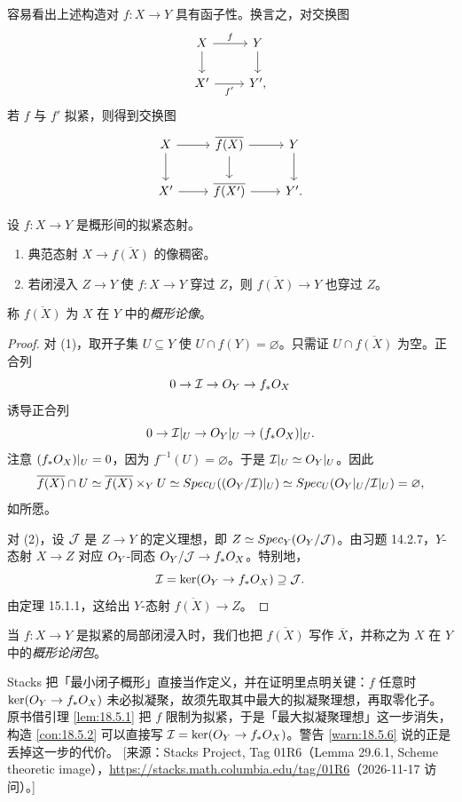 \begin{remark}\label{rem:18.5.3}
容易看出上述构造对 $f:X\to Y$ 具有函子性。换言之，对交换图
\[
\begin{tikzcd}
X \arrow[r,"f"] \arrow[d] & Y \arrow[d] \\
X' \arrow[r,"f'"'] & Y',
\end{tikzcd}
\]
若 $f$ 与 $f'$ 拟紧，则得到交换图
\[
\begin{tikzcd}
X \arrow[r] \arrow[d] & \overline{f(X)} \arrow[r] \arrow[d] & Y \arrow[d] \\
X' \arrow[r] & \overline{f(X')} \arrow[r] & Y'.
\end{tikzcd}
\]
\end{remark}

\begin{propdef}\label{prop:18.5.4}
设 $f:X\to Y$ 是概形间的拟紧态射。
\begin{enumerate}[label=(\roman*),leftmargin=2em,itemsep=0.25ex]
  \item 典范态射 $X\to\overline{f(X)}$ 的像稠密。
  \item 若闭浸入 $Z\to Y$ 使 $f:X\to Y$ 穿过 $Z$，则 $\overline{f(X)}\to Y$ 也穿过 $Z$。
\end{enumerate}
称 $\overline{f(X)}$ 为 $X$ 在 $Y$ 中的\emph{概形论像}。
\end{propdef}

\begin{proof}
对 (1)，取开子集 $U\subseteq Y$ 使 $U\cap f(Y)=\varnothing$。只需证 $U\cap\overline{f(X)}$ 为空。正合列
\[
0\to\mathcal{I}\to O_Y\to f_*O_X
\]
诱导正合列
\[
0\to\mathcal{I}|_U\to O_Y|_U\to(f_*O_X)|_U.
\]
注意 $(f_*O_X)|_U=0$，因为 $f^{-1}(U)=\varnothing$。于是 $\mathcal{I}|_U\simeq O_Y|_U$。因此
\[
\overline{f(X)}\cap U\simeq\overline{f(X)}\times_Y U\simeq Spec_U((O_Y/\mathcal{I})|_U)\simeq Spec_U(O_Y|_U/\mathcal{I}|_U)=\varnothing,
\]
如所愿。

对 (2)，设 $\mathcal{J}$ 是 $Z\to Y$ 的定义理想，即 $Z\simeq Spec_Y(O_Y/\mathcal{J})$。由习题 14.2.7，$Y$-态射 $X\to Z$ 对应 $O_Y$-同态 $O_Y/\mathcal{J}\to f_*O_X$。特别地，
\[
\mathcal{I}=\ker(O_Y\to f_*O_X)\supseteq\mathcal{J}.
\]
由定理 15.1.1，这给出 $Y$-态射 $\overline{f(X)}\to Z$。
\end{proof}

当 $f:X\to Y$ 是拟紧的局部闭浸入时，我们也把 $\overline{f(X)}$ 写作 $\overline{X}$，并称之为 $X$ 在 $Y$ 中的\emph{概形论闭包}。

\begin{yizhu}
Stacks 把「最小闭子概形」直接当作定义，并在证明里点明关键：$f$ 任意时 $\ker(O_Y\to f_*O_X)$ 未必拟凝聚，故须先取其中最大的拟凝聚理想，再取零化子。原书借引理 \ref{lem:18.5.1} 把 $f$ 限制为拟紧，于是「最大拟凝聚理想」这一步消失，构造 \ref{con:18.5.2} 可以直接写 $\mathcal{I}=\ker(O_Y\to f_*O_X)$。警告 \ref{warn:18.5.6} 说的正是丢掉这一步的代价。
[来源：Stacks Project, Tag 01R6（Lemma 29.6.1, Scheme theoretic image），\url{https://stacks.math.columbia.edu/tag/01R6}（2026-11-17 访问）。]
\end{yizhu}

